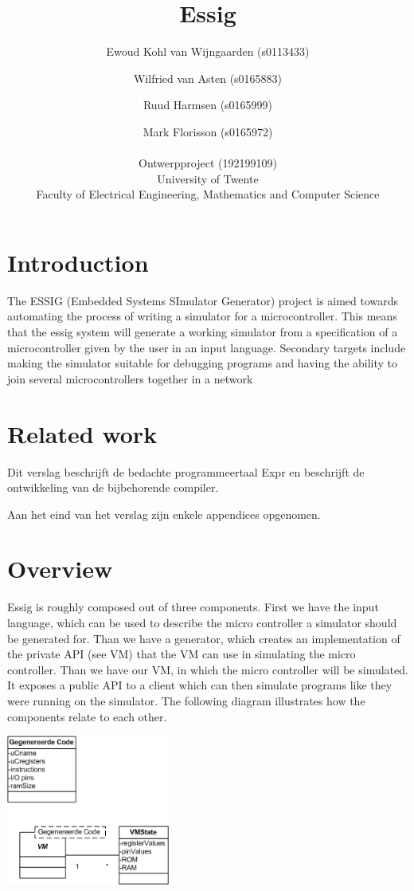 \documentclass[a4paper]{report}
\title{Essig}
\author{
	Ewoud Kohl van Wijngaarden (s0113433)
	\and
	Wilfried van Asten (s0165883)
	\and
	Ruud Harmsen (s0165999)
	\and
	Mark Florisson (s0165972)
	\\
	\\
	\small Ontwerpproject (192199109) \\
	\small University of Twente \\
	\small Faculty of Electrical Engineering, Mathematics and Computer Science
}
\date{}
\begin{document}
\maketitle

\setcounter{tocdepth}{10}
\renewcommand\contentsname{Table of Contents}
\tableofcontents
\clearpage{}
\chapter{Introduction}
The ESSIG (Embedded Systems SImulator Generator) project is aimed
towards automating the process of writing a simulator for a
microcontroller. This means that the essig system will generate a
working simulator from a specification of a microcontroller given by
the user in an input language. Secondary targets include making the
simulator suitable for debugging programs and having the ability to
join several microcontrollers together in a network

\chapter{Related work}
Dit verslag beschrijft de bedachte programmeertaal Expr en beschrijft de
ontwikkeling van de bijbehorende compiler.

Aan het eind van het verslag zijn enkele appendices opgenomen.

\chapter{Overview}
Essig is roughly composed out of three components. First we have the
input language, which can be used to describe the micro controller a
simulator should be generated for. Than we have a generator, which
creates an implementation of the private API (see VM) that the VM can
use in simulating the micro controller. Than we have our VM, in which
the micro controller will be simulated. It exposes a public API to a
client which can then simulate programs like they were running on the
simulator. The following diagram illustrates how the components relate
to each other.

\begin{center}
\includegraphics[width=5.376cm,height=4.932cm]{Essig-img002.png}
\end{center}
\end{document}
